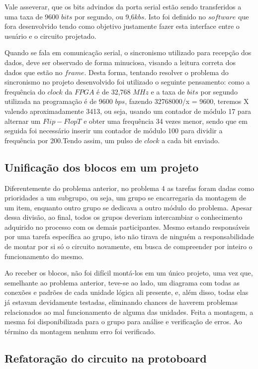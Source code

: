 \documentclass[12pt]{article}
\begin{document}
Vale asseverar, que os bits advindos da porta serial estão sendo transferidos a uma taxa de 9600 $bits$ por segundo, ou 9,6$kbs$. Isto foi definido no $software$ que fora desenvolvido tendo como objetivo justamente fazer esta interface entre o usuário e o circuito projetado.

Quando se fala em comunicação serial, o sincronismo utilizado para recepção dos dados, deve ser observado de forma minuciosa, visando a leitura correta dos dados que estão no $frame$.  Desta forma, tentando resolver o problema do sincronismo no projeto desenvolvido foi utilizado o seguinte pensamento: como a frequência do $clock$ da $FPGA$ é de 32,768 $MHz$ e a taxa de $bits$ por segundo utilizada na programação é de 9600 $bps$, fazendo 32768000/x = 9600, teremos X valendo aproximadamente 3413, ou seja, usando um contador de módulo 17 para alternar um $Flip-Flop T$ e obter uma frequência 34 vezes menor, sendo que em seguida foi necessário inserir um contador de módulo 100 para dividir a frequência por 200.Tendo assim, um pulso de $clock$ a cada bit enviado.

\subsection{Unificação dos blocos em um projeto}

Diferentemente do problema anterior, no problema 4 as tarefas foram dadas como prioridades a um subgrupo, ou seja, um grupo se encarregaria da montagem de um item, enquanto outro grupo se dedicava a outro módulo do problema. Apesar dessa divisão, ao final, todos os grupos deveriam intercambiar o conhecimento adquirido no processo com os demais participantes. Mesmo estando responsáveis por uma tarefa específica ao grupo, isto não tirava de ninguém a responsabilidade de montar por si só o circuito novamente, em busca de compreender por inteiro o funcionamento do mesmo.

Ao receber os blocos, não foi difícil montá-los em um único projeto, uma vez que, semelhante ao problema anterior, teve-se ao lado, um diagrama com todas as conexões e padrões de cada unidade lógica ali presente, e, além disso, todas elas já estavam devidamente testadas, eliminando chances de haverem problemas relacionados ao mal funcionamento de alguma das unidades. Feita a montagem, a mesma foi disponibilizada para o grupo para análise e verificação de erros. Ao término da montagem nenhum erro foi verificado.

\subsection{Refatoração do circuito na protoboard}
\end{document}
